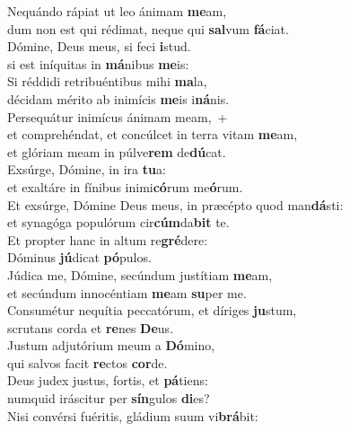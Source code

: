 \evenverse Nequándo rápiat ut leo ánimam \textbf{me}am,~\*\\
\evenverse dum non est qui rédimat, neque qui \textbf{sal}vum \textbf{fá}ciat.\\
\oddverse Dómine, Deus meus, si feci \textbf{i}stud.~\*\\
\oddverse si est iníquitas in \textbf{má}nibus \textbf{me}is:\\
\evenverse Si réddidi retribuéntibus mihi \textbf{ma}la,~\*\\
\evenverse décidam mérito ab inimícis \textbf{me}is i\textbf{ná}nis.\\
\oddverse Persequátur inimícus ánimam meam,~+\\
\oddverse  et comprehéndat, et concúlcet in terra vitam \textbf{me}am,~\*\\
\oddverse et glóriam meam in púlve\textbf{rem} de\textbf{dú}cat.\\
\evenverse Exsúrge, Dómine, in ira \textbf{tu}a:~\*\\
\evenverse et exaltáre in fínibus inimi\textbf{có}rum me\textbf{ó}rum.\\
\oddverse Et exsúrge, Dómine Deus meus, in præcépto quod man\textbf{dá}sti:~\*\\
\oddverse et synagóga populórum cir\textbf{cúm}da\textbf{bit} te.\\
\evenverse Et propter hanc in altum re\textbf{gré}dere:~\*\\
\evenverse Dóminus \textbf{jú}dicat \textbf{pó}pulos.\\
\oddverse Júdica me, Dómine, secúndum justítiam \textbf{me}am,~\*\\
\oddverse et secúndum innocéntiam \textbf{me}am \textbf{su}per me.\\
\evenverse Consumétur nequítia peccatórum, et díriges \textbf{ju}stum,~\*\\
\evenverse scrutans corda et \textbf{re}nes \textbf{De}us.\\
\oddverse Justum adjutórium meum a \textbf{Dó}mino,~\*\\
\oddverse qui salvos facit \textbf{re}ctos \textbf{cor}de.\\
\evenverse Deus judex justus, fortis, et \textbf{pá}tiens:~\*\\
\evenverse numquid iráscitur per \textbf{sín}gulos \textbf{di}es?\\
\oddverse Nisi convérsi fuéritis, gládium suum vi\textbf{brá}bit:~\*\\
